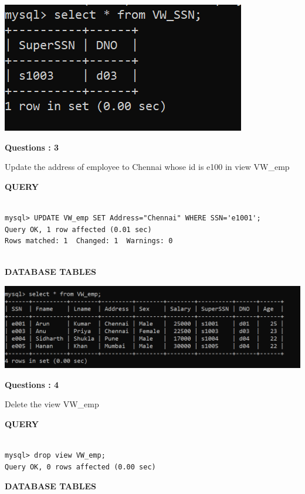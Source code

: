 \documentclass[a4paper,12pt]{report}
\begin{document}
\includegraphics[scale=0.9]{vwssn.png}
\begin{flushleft}
    \textbf{Questions : 3}
\end{flushleft}
Update the address of employee to Chennai whose id is e100 in view VW\_emp
	\begin{flushleft}
		\textbf{QUERY }
	\end{flushleft}
 \begin{verbatim}
 
mysql> UPDATE VW_emp SET Address="Chennai" WHERE SSN='e1001';
Query OK, 1 row affected (0.01 sec)
Rows matched: 1  Changed: 1  Warnings: 0


\end{verbatim}
\begin{flushleft}
		\textbf{DATABASE TABLES} 
\end{flushleft} 

\includegraphics[scale=0.9]{vwupd.png}
\begin{flushleft}
    \textbf{Questions : 4}
\end{flushleft}
Delete the view VW\_emp
	\begin{flushleft}
		\textbf{QUERY }
	\end{flushleft}
 \begin{verbatim}
 
mysql> drop view VW_emp;
Query OK, 0 rows affected (0.00 sec)

\end{verbatim}
\begin{flushleft}
		\textbf{DATABASE TABLES} 
\end{flushleft} 
\end{document}
